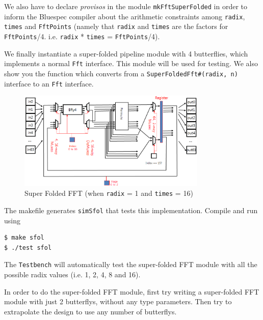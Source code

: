 \documentclass{article}
\begin{document}
We also have to declare \textit{provisos} in the module
\texttt{mkFftSuperFolded} in order to inform the Bluespec compiler about the
arithmetic constraints among \texttt{radix}, \texttt{times} and \texttt{FftPoints} (namely that
\texttt{radix} and \texttt{times} are the factors for \texttt{FftPoints}/4. i.e. 
\texttt{radix} * \texttt{times} = \texttt{FftPoints}/4).

We finally instantiate a super-folded pipeline module with 4 butterflies, which
implements a normal \texttt{Fft} interface. This module will be used for
testing. We also show you the function which converts from a
\texttt{SuperFoldedFft\#(radix, n)} interface to an \texttt{Fft} interface.

\begin{figure}[!h]
\centering
\includegraphics[width=0.8\textwidth]{figs/sfol.png}
\caption{Super Folded FFT (when \texttt{radix} = 1 and \texttt{times} = 16)}
\label{sfol}
\end{figure}

The makefile generates \texttt{simSfol} that tests this implementation.
Compile and run using
\begin{verbatim}
$ make sfol
$ ./test sfol
\end{verbatim}

The \texttt{Testbench} will automatically test the super-folded FFT module with 
all the possible radix values (i.e. 1, 2, 4, 8 and 16). 

In order to do the super-folded FFT module, first try writing a super-folded
FFT module with just 2 butterflys, without any type parameters. Then try to
extrapolate the design to use any number of butterflys.
\end{document}
